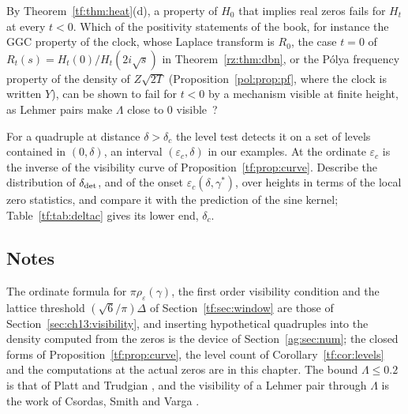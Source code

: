 \begin{problem}\label{tf:prob:heat}
By Theorem~\ref{tf:thm:heat}(d), a property of $H_0$ that implies real zeros fails for $H_t$ at every $t<0$. Which of the positivity statements of the book, for instance the GGC property of the clock, whose Laplace transform is $R_0$, the case $t=0$ of $R_t(s)=H_t(0)/H_t(2i\sqrt s)$ in Theorem~\ref{rz:thm:dbn}, or the P\'olya frequency property of the density of $Z\sqrt{2T}$ (Proposition~\ref{pol:prop:pf}, where the clock is written $Y$), can be shown to fail for $t<0$ by a mechanism visible at finite height, as Lehmer pairs make $\Lambda$ close to $0$ visible~\cite{CSV94}?
\end{problem}

\begin{problem}\label{tf:prob:window}
For a quadruple at distance $\delta>\delta_c$ the level test detects it on a set of levels contained in $(0,\delta)$, an interval $(\varepsilon_c,\delta)$ in our examples. At the ordinate $\varepsilon_c$ is the inverse of the visibility curve of Proposition~\ref{tf:prop:curve}. Describe the distribution of $\delta_{\rm det}$, and of the onset $\varepsilon_c(\delta,\gamma^*)$, over heights in terms of the local zero statistics, and compare it with the prediction of the sine kernel; Table~\ref{tf:tab:deltac} gives its lower end, $\delta_c$.
\end{problem}

\subsection*{Notes}

The ordinate formula for $\pi\rho_\varepsilon(\gamma)$, the first order visibility condition and the lattice threshold $(\sqrt6/\pi)\Delta$ of Section~\ref{tf:sec:window} are those of Section~\ref{sec:ch13:visibility}, and inserting hypothetical quadruples into the density computed from the zeros is the device of Section~\ref{ag:sec:num}; the closed forms of Proposition~\ref{tf:prop:curve}, the level count of Corollary~\ref{tf:cor:levels} and the computations at the actual zeros are in this chapter. The bound $\Lambda\le0.2$ is that of Platt and Trudgian \cite{PT21}, and the visibility of a Lehmer pair through $\Lambda$ is the work of Csordas, Smith and Varga \cite{CSV94}.
